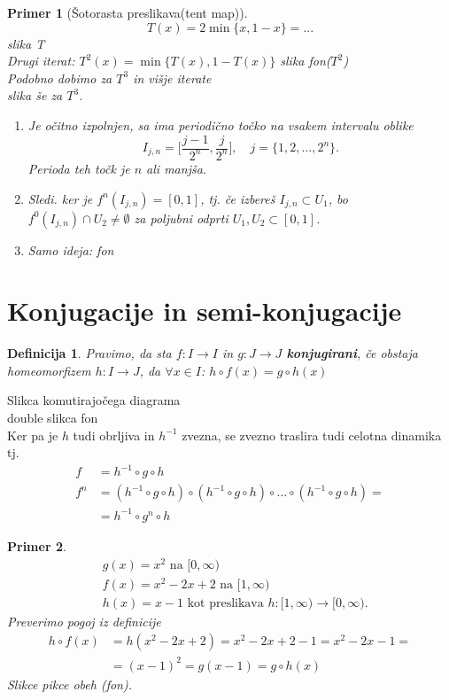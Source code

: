 \documentclass{article}
\newtheorem{definicija}{Definicija}
\newtheorem{primer}{Primer}
\begin{document}
\begin{primer}[Šotorasta preslikava(tent map)]
$$
T(x) = 2\min\{x, 1 - x\} = ...
$$
slika T \\ 
Drugi iterat: $T^2(x) = \min\{T(x), 1 - T(x)\}$
slika fon($T^2$) \\ 
Podobno dobimo za $T^3$ in višje iterate \\
slika še za $T^3$.
\begin{enumerate}
\item[c1)] Je očitno izpolnjen, sa ima periodično točko na vsakem intervalu oblike 
$$
I_{j, n} = \Big[\frac{j-1}{2^n}, \frac{j}{2^n}\Big], \quad j = \{1, 2, \dots, 2^n\}.
$$
Perioda teh točk je $n$ ali manjša.
\item[ii)] Sledi. ker je $f^n(I_{j,n}) = [0, 1]$, tj.
če izbereš $I_{j, n} \subset U_1$, bo $f^0(I_{j, n}) \cap U_2 \neq \emptyset$ za poljubni odprti $U_1, U_2 \subset [0, 1]$.
\item[c3)] Samo ideja: fon
\end{enumerate}
\end{primer}

\section{Konjugacije in semi-konjugacije}

\begin{definicija}
Pravimo, da sta $f: I \rightarrow I$ in $g: J \rightarrow J$ \textbf{konjugirani}, če obstaja homeomorfizem $h:I \rightarrow J$, da $\forall x\in I$: $h \circ f(x) = g\circ h(x) $
\end{definicija}
Slikca komutirajočega diagrama \\ 
double slikca fon\\ 

Ker pa je $h$ tudi obrljiva in $h^{-1}$ zvezna, se zvezno traslira tudi celotna dinamika tj.
\begin{align*}
f &= h^{-1} \circ g \circ h\\ 
f^n &= (h^{-1} \circ g \circ h) \circ (h^{-1} \circ g \circ h) \circ \dots \circ (h^{-1} \circ g \circ h) = \\ 
&= h^{-1} \circ g^n \circ h
\end{align*}

\begin{primer}
\begin{align*}
&g(x) = x^2 \text{ na } [0, \infty) \\ 
&f(x) = x^2 - 2x + 2 \text{ na } [1, \infty) \\ 
&h(x) = x - 1 \text{ kot preslikava } h:[1, \infty) \rightarrow [0, \infty).
\end{align*}
Preverimo pogoj iz definicije 
\begin{align*}
h\circ f(x) &= h(x^2 - 2x + 2) = x^2 -2x + 2 - 1 = x^2 - 2x - 1 = \\ 
&=(x-1)^2 = g(x-1) = g\circ h(x)  
\end{align*}
Slikce pikce obeh (fon).\\ 
\end{primer}
\end{document}
